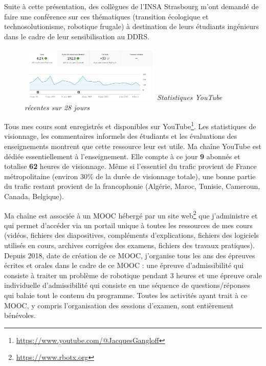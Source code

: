 \documentclass[a4paper,12pt]{article}
\begin{document}
Suite à cette présentation, des collègues de l'INSA Strasbourg m'ont demandé de faire une conférence sur ces thématiques (transition écologique et technosolutionisme, robotique frugale) à destination de leurs étudiants ingénieurs dans le cadre de leur sensibilisation au DDRS.

\begin{figure}
\centering
\vskip-4mm
\includegraphics[width=0.6\textwidth]{YouTube.png}
{\em Statistiques YouTube récentes sur 28 jours}\vskip-4mm
\end{figure}
Tous mes cours sont enregistrés et disponibles sur YouTube\footnote{\url{https://www.youtube.com/@JacquesGangloff}}. Les statistiques de visionnage, les commentaires informels des étudiants et les évaluations des enseignements montrent que cette ressource leur est utile. Ma chaîne YouTube est dédiée essentiellement à l’enseignement. Elle compte à ce jour {\bf 9} abonnés et totalise {\bf 62} heures de visionnage. Même si l'essentiel du trafic provient de France métropolitaine (environ 30\% de la durée de visionnage totale), une bonne partie du trafic restant provient de la francophonie (Algérie, Maroc, Tunisie, Cameroun, Canada, Belgique).

Ma chaîne est associée à un MOOC hébergé par un site web\footnote{\url{https://www.rbotx.org}} que j’administre et qui permet d’accéder via un portail unique à toutes les ressources de mes cours (vidéos, fichiers des diapositives, compléments d’explications, fichiers des logiciels utilisés en cours, archives corrigées des examens, fichiers des travaux pratiques). Depuis 2018, date de création de ce MOOC, j'organise tous les ans des épreuves écrites et orales dans le cadre de ce MOOC : une épreuve d'admissibilité qui consiste à traiter un problème de robotique pendant 3 heures et une épreuve orale individuelle d'admissibilité qui consiste en une séquence de questions/réponses qui balaie tout le contenu du programme. Toutes les activités ayant trait à ce MOOC, y compris l’organisation des sessions d’examen, sont entièrement bénévoles.
\end{document}
